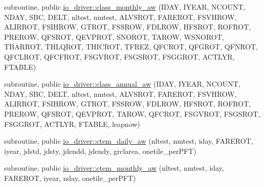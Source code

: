 {\bf }\par
\begin{DoxyCompactItemize}
\item 
subroutine, public \hyperlink{group__io__driver__class__monthly__aw_ga58c2e12621635a74096a8f7c142f85de}{io\+\_\+driver\+::class\+\_\+monthly\+\_\+aw} (I\+D\+A\+Y, I\+Y\+E\+A\+R, N\+C\+O\+U\+N\+T, N\+D\+A\+Y, S\+B\+C, D\+E\+L\+T, nltest, nmtest, A\+L\+V\+S\+R\+O\+T, F\+A\+R\+E\+R\+O\+T, F\+S\+V\+H\+R\+O\+W, A\+L\+I\+R\+R\+O\+T, F\+S\+I\+H\+R\+O\+W, G\+T\+R\+O\+T, F\+S\+S\+R\+O\+W, F\+D\+L\+R\+O\+W, H\+F\+S\+R\+O\+T, R\+O\+F\+R\+O\+T, P\+R\+E\+R\+O\+W, Q\+F\+S\+R\+O\+T, Q\+E\+V\+P\+R\+O\+T, S\+N\+O\+R\+O\+T, T\+A\+R\+O\+W, W\+S\+N\+O\+R\+O\+T, T\+B\+A\+R\+R\+O\+T, T\+H\+L\+Q\+R\+O\+T, T\+H\+I\+C\+R\+O\+T, T\+F\+R\+E\+Z, Q\+F\+C\+R\+O\+T, Q\+F\+G\+R\+O\+T, Q\+F\+N\+R\+O\+T, Q\+F\+C\+L\+R\+O\+T, Q\+F\+C\+F\+R\+O\+T, F\+S\+G\+V\+R\+O\+T, F\+S\+G\+S\+R\+O\+T, F\+S\+G\+G\+R\+O\+T, A\+C\+T\+L\+Y\+R, F\+T\+A\+B\+L\+E)
\end{DoxyCompactItemize}

{\bf }\par
\begin{DoxyCompactItemize}
\item 
subroutine, public \hyperlink{group__io__driver__class__annual__aw_ga0f389a580ed1952081408efc5dee850b}{io\+\_\+driver\+::class\+\_\+annual\+\_\+aw} (I\+D\+A\+Y, I\+Y\+E\+A\+R, N\+C\+O\+U\+N\+T, N\+D\+A\+Y, S\+B\+C, D\+E\+L\+T, nltest, nmtest, A\+L\+V\+S\+R\+O\+T, F\+A\+R\+E\+R\+O\+T, F\+S\+V\+H\+R\+O\+W, A\+L\+I\+R\+R\+O\+T, F\+S\+I\+H\+R\+O\+W, G\+T\+R\+O\+T, F\+S\+S\+R\+O\+W, F\+D\+L\+R\+O\+W, H\+F\+S\+R\+O\+T, R\+O\+F\+R\+O\+T, P\+R\+E\+R\+O\+W, Q\+F\+S\+R\+O\+T, Q\+E\+V\+P\+R\+O\+T, T\+A\+R\+O\+W, Q\+F\+C\+R\+O\+T, F\+S\+G\+V\+R\+O\+T, F\+S\+G\+S\+R\+O\+T, F\+S\+G\+G\+R\+O\+T, A\+C\+T\+L\+Y\+R, F\+T\+A\+B\+L\+E, leapnow)
\end{DoxyCompactItemize}

{\bf }\par
\begin{DoxyCompactItemize}
\item 
subroutine, public \hyperlink{group__io__driver__ctem__daily__aw_ga2bf58d7f6363b0469ee120bd8090de6f}{io\+\_\+driver\+::ctem\+\_\+daily\+\_\+aw} (nltest, nmtest, iday, F\+A\+R\+E\+R\+O\+T, iyear, jdstd, jdsty, jdendd, jdendy, grclarea, onetile\+\_\+per\+P\+F\+T)
\end{DoxyCompactItemize}

{\bf }\par
\begin{DoxyCompactItemize}
\item 
subroutine, public \hyperlink{group__io__driver__ctem__monthly__aw_gaefba66acca4c5138cfa2500f7a030022}{io\+\_\+driver\+::ctem\+\_\+monthly\+\_\+aw} (nltest, nmtest, iday, F\+A\+R\+E\+R\+O\+T, iyear, nday, onetile\+\_\+per\+P\+F\+T)
\end{DoxyCompactItemize}

